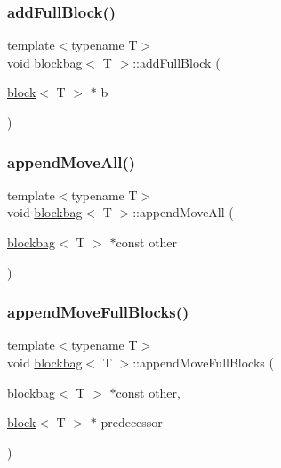 \subsubsection{\texorpdfstring{add\+Full\+Block()}{addFullBlock()}}
{\footnotesize\ttfamily template$<$typename T$>$ \\
void \hyperlink{classblockbag}{blockbag}$<$ T $>$\+::add\+Full\+Block (\begin{DoxyParamCaption}\item[{\hyperlink{classblock}{block}$<$ T $>$ $\ast$}]{b }\end{DoxyParamCaption})\hspace{0.3cm}{\ttfamily [inline]}}

\mbox{\label{classblockbag_ad7964703f189c0cc1417ba6d4d642093}} 
\subsubsection{\texorpdfstring{append\+Move\+All()}{appendMoveAll()}}
{\footnotesize\ttfamily template$<$typename T$>$ \\
void \hyperlink{classblockbag}{blockbag}$<$ T $>$\+::append\+Move\+All (\begin{DoxyParamCaption}\item[{\hyperlink{classblockbag}{blockbag}$<$ T $>$ $\ast$const}]{other }\end{DoxyParamCaption})\hspace{0.3cm}{\ttfamily [inline]}}

\mbox{\label{classblockbag_a696366e13be4fe60aefe9a359833aea2}} 
\subsubsection{\texorpdfstring{append\+Move\+Full\+Blocks()}{appendMoveFullBlocks()}\hspace{0.1cm}{\footnotesize\ttfamily [1/2]}}
{\footnotesize\ttfamily template$<$typename T$>$ \\
void \hyperlink{classblockbag}{blockbag}$<$ T $>$\+::append\+Move\+Full\+Blocks (\begin{DoxyParamCaption}\item[{\hyperlink{classblockbag}{blockbag}$<$ T $>$ $\ast$const}]{other,  }\item[{\hyperlink{classblock}{block}$<$ T $>$ $\ast$}]{predecessor }\end{DoxyParamCaption})\hspace{0.3cm}{\ttfamily [inline]}}

